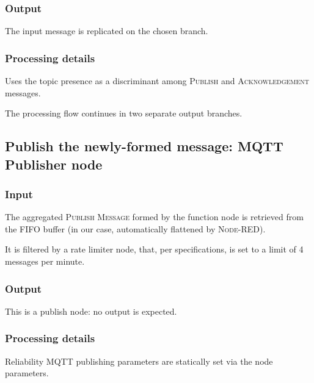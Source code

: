 \documentclass[a4paper,11pt]{article} %
\begin{document}
    \subsubsection{Output}

    The input message is replicated on the chosen branch.

    \subsubsection{Processing details}

    Uses the topic presence as a discriminant among \textsc{Publish} and \textsc{Acknowledgement} messages.

    \smallskip

    The processing flow continues in two separate output branches.

    \subsection{Publish the newly-formed message: MQTT Publisher node}\label{subsec:publish-the-newly-formed-message:-mqtt-publisher-node}

    \subsubsection{Input}

    The aggregated \textsc{Publish Message} formed by the function node is retrieved from the FIFO buffer (in our case, automatically flattened by \textsc{Node-RED}).

    \smallskip

    It is filtered by a rate limiter node, that, per specifications, is set to a limit of 4 messages per minute.

    \subsubsection{Output}

    This is a publish node: no output is expected.

    \subsubsection{Processing details}

    Reliability MQTT publishing parameters are statically set via the node parameters.

    \smallskip
\end{document}
